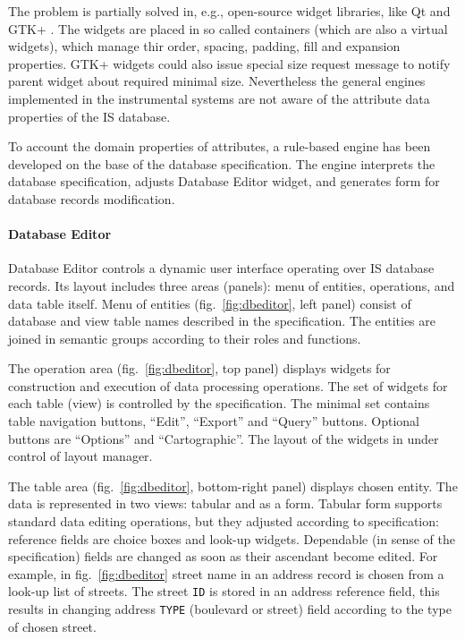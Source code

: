 \documentclass[conference]{IEEEtran}
\begin{document}
The problem is partially solved in, e.g., open-source widget libraries, like Qt \cite{qt} and GTK+ \cite{gtk}.  The widgets are placed in so called containers (which are also a virtual widgets), which manage thir order, spacing, padding, fill and expansion properties.  GTK+ widgets could also issue special size request message to notify parent widget about required minimal size.  Nevertheless the general engines implemented in the instrumental systems are not aware of the attribute data properties of the IS database.

To account the domain properties of attributes, a rule-based engine has been developed on the base of the database specification.  The engine interprets the database specification, adjusts Database Editor widget, and generates form for database records modification.

\paragraph{Database Editor}

Database Editor controls a dynamic user interface operating over IS database records.  Its layout includes three areas (panels): menu of entities, operations, and data table itself.  Menu of entities (fig.~\ref{fig:dbeditor}, left panel) consist of database and view table names described in the specification.  The entities are joined in semantic groups according to their roles and functions.

The operation area (fig.~\ref{fig:dbeditor}, top panel) displays widgets for construction and execution of data processing operations.  The set of widgets for each table (view) is controlled by the specification.  The minimal set contains table navigation buttons, ``Edit'', ``Export'' and ``Query'' buttons.  Optional buttons are ``Options'' and ``Cartographic''.  The layout of the widgets in under control of layout manager.

The table area (fig.~\ref{fig:dbeditor}, bottom-right panel) displays chosen entity.  The data is represented in two views: tabular and as a form.  Tabular form supports standard data editing operations, but they adjusted according to specification: reference fields are choice boxes and look-up widgets.  Dependable (in sense of the specification) fields are changed as soon as their ascendant become edited.  For example, in fig.~\ref{fig:dbeditor} street name in an address record is chosen from a look-up list of streets.  The street \texttt{ID} is stored in an address reference field, this results in changing address \texttt{TYPE} (boulevard or street) field according to the type of chosen street.
\end{document}
